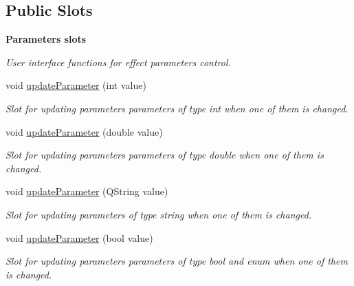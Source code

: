 \subsection*{Public Slots}
\begin{Indent}\textbf{ Parameters slots}\par
{\em User interface functions for effect parameters control. }\begin{DoxyCompactItemize}
\item 
void \hyperlink{class_effects_monitor_ae2cc992b9bb457da2a0cdab854a414ea}{update\+Parameter} (int value)
\begin{DoxyCompactList}\small\item\em Slot for updating parameters parameters of type int when one of them is changed. \end{DoxyCompactList}\item 
void \hyperlink{class_effects_monitor_aa32c90185185305770ad5ab911641e17}{update\+Parameter} (double value)
\begin{DoxyCompactList}\small\item\em Slot for updating parameters parameters of type double when one of them is changed. \end{DoxyCompactList}\item 
void \hyperlink{class_effects_monitor_ab2be23fba9628432cacdfc83cc75e9f4}{update\+Parameter} (Q\+String value)
\begin{DoxyCompactList}\small\item\em Slot for updating parameters of type string when one of them is changed. \end{DoxyCompactList}\item 
void \hyperlink{class_effects_monitor_a3488d6ae49a81de79fe6913a7bebcafe}{update\+Parameter} (bool value)
\begin{DoxyCompactList}\small\item\em Slot for updating parameters parameters of type bool and enum when one of them is changed. \end{DoxyCompactList}\end{DoxyCompactItemize}
\end{Indent}
